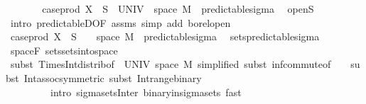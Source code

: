 \begin{isabellebody}
\ \ \ \ \isamarkupfalse%
\ \isamarkupfalse%
\ {\isachardoublequoteopen}case{\isacharunderscore}{\kern0pt}prod\ X\ {\isacharminus}{\kern0pt}{\isacharbackquote}{\kern0pt}\ S\ {\isasyminter}\ {\isacharparenleft}{\kern0pt}UNIV\ {\isasymtimes}\ space\ M{\isacharparenright}{\kern0pt}\ {\isasymin}\ predictable{\isacharunderscore}{\kern0pt}sigma{\isachardoublequoteclose}\ \isamarkupfalse%
\ open{\isacharunderscore}{\kern0pt}S\ \isamarkupfalse%
\ {\isacharparenleft}{\kern0pt}intro\ predictableD{\isacharbrackleft}{\kern0pt}OF\ assms{\isacharbrackright}{\kern0pt}{\isacharcomma}{\kern0pt}\ simp\ add{\isacharcolon}{\kern0pt}\ borel{\isacharunderscore}{\kern0pt}open{\isacharparenright}{\kern0pt}\ \ \isanewline
\ \ \ \ \isamarkupfalse%
\ \isamarkupfalse%
\ {\isachardoublequoteopen}case{\isacharunderscore}{\kern0pt}prod\ X\ {\isacharminus}{\kern0pt}{\isacharbackquote}{\kern0pt}\ S\ {\isasyminter}\ {\isacharparenleft}{\kern0pt}{\isacharbraceleft}{\kern0pt}{}{\isacharbraceright}{\kern0pt}\ {\isasymtimes}\ space\ M{\isacharparenright}{\kern0pt}\ {\isasymin}\ predictable{\isacharunderscore}{\kern0pt}sigma{\isachardoublequoteclose}\ \isamarkupfalse%
\ sets{\isacharunderscore}{\kern0pt}predictable{\isacharunderscore}{\kern0pt}sigma\ \isamarkupfalse%
\ space{\isacharunderscore}{\kern0pt}F\ sets{\isachardot}{\kern0pt}sets{\isacharunderscore}{\kern0pt}into{\isacharunderscore}{\kern0pt}space\isanewline
\ \ \ \ \ \ \isamarkupfalse%
\ {\isacharparenleft}{\kern0pt}subst\ Times{\isacharunderscore}{\kern0pt}Int{\isacharunderscore}{\kern0pt}distrib{}{\isacharbrackleft}{\kern0pt}of\ {\isachardoublequoteopen}{\isacharbraceleft}{\kern0pt}{}{\isacharbraceright}{\kern0pt}{\isachardoublequoteclose}\ UNIV\ {\isachardoublequoteopen}space\ M{\isachardoublequoteclose}{\isacharcomma}{\kern0pt}\ simplified{\isacharbrackright}{\kern0pt}{\isacharcomma}{\kern0pt}\ subst\ inf{\isachardot}{\kern0pt}commute{\isacharbrackleft}{\kern0pt}of\ {\isachardoublequoteopen}{\isacharunderscore}{\kern0pt}\ {\isasymtimes}\ {\isacharunderscore}{\kern0pt}{\isachardoublequoteclose}{\isacharbrackright}{\kern0pt}{\isacharcomma}{\kern0pt}\ subst\ Int{\isacharunderscore}{\kern0pt}assoc{\isacharbrackleft}{\kern0pt}symmetric{\isacharbrackright}{\kern0pt}{\isacharcomma}{\kern0pt}\ subst\ Int{\isacharunderscore}{\kern0pt}range{\isacharunderscore}{\kern0pt}binary{\isacharparenright}{\kern0pt}\ \isanewline
\ \ \ \ \ \ \ \ \ {\isacharparenleft}{\kern0pt}intro\ sigma{\isacharunderscore}{\kern0pt}sets{\isacharunderscore}{\kern0pt}Inter\ binary{\isacharunderscore}{\kern0pt}in{\isacharunderscore}{\kern0pt}sigma{\isacharunderscore}{\kern0pt}sets{\isacharcomma}{\kern0pt}\ fast{\isacharparenright}{\kern0pt}{\isacharplus}{\kern0pt}\isanewline

\end{isabellebody}
